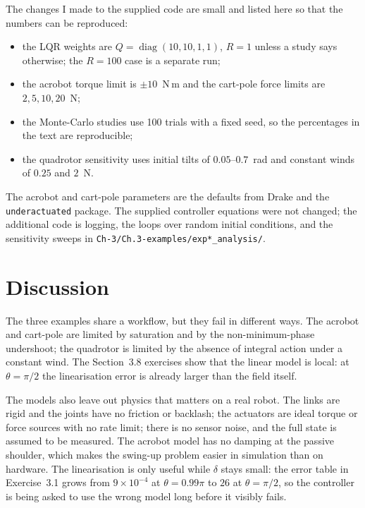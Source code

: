 \documentclass[11pt]{report}
\begin{document}
The changes I made to the supplied code are small and listed here so that the
numbers can be reproduced:
\begin{itemize}[leftmargin=1.4em,itemsep=1pt]
  \item the LQR weights are $Q=\operatorname{diag}(10,10,1,1)$, $R=1$ unless a
        study says otherwise; the $R=100$ case is a separate run;
  \item the acrobot torque limit is $\pm10$~N\,m and the cart-pole force limits
        are $2,5,10,20$~N;
  \item the Monte-Carlo studies use 100 trials with a fixed seed, so the
        percentages in the text are reproducible;
  \item the quadrotor sensitivity uses initial tilts of $0.05$--$0.7$~rad and
        constant winds of $0.25$ and $2$~N.
\end{itemize}
The acrobot and cart-pole parameters are the defaults from Drake and the
\texttt{underactuated} package.  The supplied controller equations were not
changed; the additional code is logging, the loops over random initial
conditions, and the sensitivity sweeps in
\texttt{Ch-3/Ch.3-examples/exp*\_analysis/}.

\section{Discussion}

The three examples share a workflow, but they fail in different ways.  The
acrobot and cart-pole are limited by saturation and by the non-minimum-phase
undershoot; the quadrotor is limited by the absence of integral action under a
constant wind.  The Section~3.8 exercises show that the linear model is local:
at $\theta=\pi/2$ the linearisation error is already larger than the field
itself.

The models also leave out physics that matters on a real robot.  The links are
rigid and the joints have no friction or backlash; the actuators are ideal
torque or force sources with no rate limit; there is no sensor noise, and the
full state is assumed to be measured.  The acrobot model has no damping at the
passive shoulder, which makes the swing-up problem easier in simulation than on
hardware.  The linearisation is only useful while $\delta$ stays small: the
error table in Exercise~3.1 grows from $9\times10^{-4}$ at $\theta=0.99\pi$ to
$26$ at $\theta=\pi/2$, so the controller is being asked to use the wrong model
long before it visibly fails.
\end{document}
